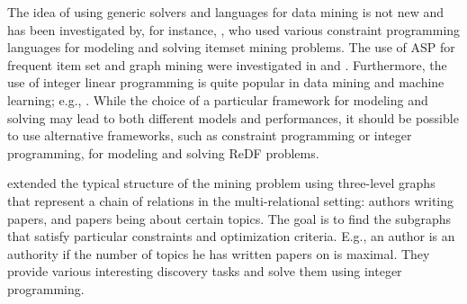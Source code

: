 The idea of using generic solvers and languages for data mining is not new and has been investigated by, for instance, \cite{GunsAIJ12,miningZinc,DBLP:conf/sac/MetivierBCKL12},
who used various constraint programming languages for modeling and solving itemset mining problems.  
The use of ASP for frequent item set and graph mining were investigated in \cite{DBLP:conf/lpnmr/Jarvisalo11} and \cite{ilp_graph_mining}.  
Furthermore, the use of 
integer linear programming is quite popular in data mining and machine learning; e.g., \cite{DBLP:conf/aaai/ChangRRR08}.
While the choice of a particular framework for modeling and solving may lead to both different models and performances, it should be possible to use alternative frameworks, such as constraint programming or integer programming, for modeling and solving ReDF problems. 

\cite{miningchains} extended the typical structure of the mining problem using three-level graphs that represent a chain of relations in the multi-relational setting: authors writing papers, and papers being about certain topics. The goal is to find the subgraphs that satisfy particular constraints and optimization criteria.
E.g., an author is an authority  if the number of topics he has written papers on is maximal. They provide various interesting discovery tasks 
and solve them using integer programming.



